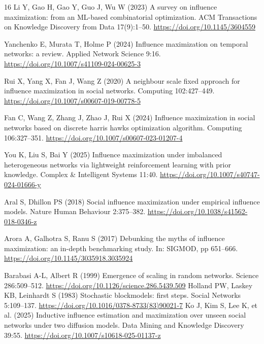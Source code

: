\documentclass[smallextended]{svjour3}
\begin{document}
\begin{thebibliography}{16}
 Li Y, Gao H, Gao Y, Guo J, Wu W (2023) A survey on influence maximization: from an ML-based combinatorial optimization. ACM Transactions on Knowledge Discovery from Data 17(9):1--50. \url{https://doi.org/10.1145/3604559}

 Yanchenko E, Murata T, Holme P (2024) Influence maximization on temporal networks: a review. Applied Network Science 9:16. \url{https://doi.org/10.1007/s41109-024-00625-3}

 Rui X, Yang X, Fan J, Wang Z (2020) A neighbour scale fixed approach for influence maximization in social networks. Computing 102:427--449. \url{https://doi.org/10.1007/s00607-019-00778-5}

 Fan C, Wang Z, Zhang J, Zhao J, Rui X (2024) Influence maximization in social networks based on discrete harris hawks optimization algorithm. Computing 106:327--351. \url{https://doi.org/10.1007/s00607-023-01207-4}

 You K, Liu S, Bai Y (2025) Influence maximization under imbalanced heterogeneous networks via lightweight reinforcement learning with prior knowledge. Complex \& Intelligent Systems 11:40. \url{https://doi.org/10.1007/s40747-024-01666-y}

 Aral S, Dhillon PS (2018) Social influence maximization under empirical influence models. Nature Human Behaviour 2:375--382. \url{https://doi.org/10.1038/s41562-018-0346-z}

 Arora A, Galhotra S, Ranu S (2017) Debunking the myths of influence maximization: an in-depth benchmarking study. In: SIGMOD, pp 651--666. \url{https://doi.org/10.1145/3035918.3035924}

 Barabasi A-L, Albert R (1999) Emergence of scaling in random networks. Science 286:509--512. \url{https://doi.org/10.1126/science.286.5439.509}
 Holland PW, Laskey KB, Leinhardt S (1983) Stochastic blockmodels: first steps. Social Networks 5:109--137. \url{https://doi.org/10.1016/0378-8733(83)90021-7}
 Ko J, Kim S, Lee K, et al. (2025) Inductive influence estimation and maximization over unseen social networks under two diffusion models. Data Mining and Knowledge Discovery 39:55. \url{https://doi.org/10.1007/s10618-025-01137-z}
\end{thebibliography}
\end{document}
